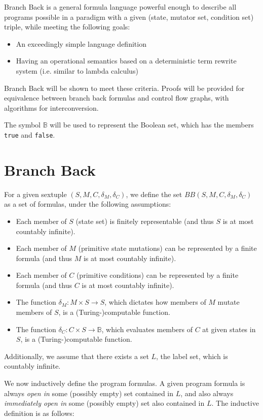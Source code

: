 \documentclass[11pt]{article}
\begin{document}
Branch Back is a general formula language powerful enough to describe all programs possible in a paradigm with a given (state, mutator set, condition set) triple, while meeting the following goals:

\begin{itemize}
\item An exceedingly simple language definition
\item Having an operational semantics based on a deterministic term rewrite system (i.e. similar to lambda calculus)
\end{itemize}

Branch Back will be shown to meet these criteria.  Proofs will be provided for equivalence between branch back formulas and control flow graphs, with algorithms for interconversion.

The symbol $\mathbb{B}$ will be used to represent the Boolean set, which has the members \texttt{true} and \texttt{false}.

\section{Branch Back}
For a given sextuple $(S, M, C, \delta_{M}, \delta_{C})$, we define the set $BB(S, M, C, \delta_{M}, \delta_{C})$ as a set of formulas, under the following assumptions:

\begin{itemize}
\item Each member of $S$ (state set) is finitely representable (and thus $S$ is at most countably infinite).
\item Each member of $M$ (primitive state mutations) can be represented by a finite formula (and thus $M$ is at most countably infinite).
\item Each member of $C$ (primitive conditions) can be represented by a finite formula (and thus $C$ is at most countably infinite).
\item The function $\delta_{M} : M \times S \rightarrow S$, which dictates how members of $M$ mutate members of $S$, is a (Turing-)computable function. 
\item The function $\delta_{C} : C \times S \rightarrow \mathbb{B}$, which evaluates members of $C$ at given states in $S$, is a (Turing-)computable function.
\end{itemize}

Additionally, we assume that there exists a set $L$, the label set, which is countably infinite.

We now inductively define the program formulas.  A given program formula is always \emph{open in} some (possibly empty) set contained in $L$, and also always \emph{immediately open in} some (possibly empty) set also contained in $L$.  The inductive definition is as follows:
\end{document}
